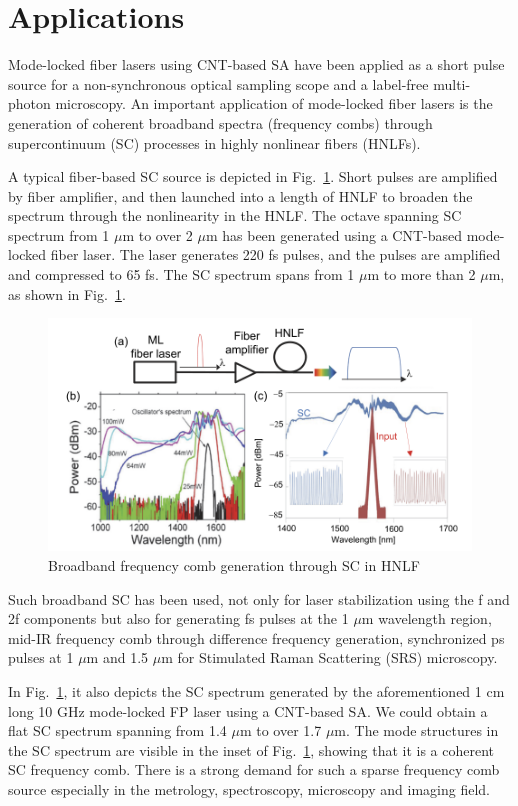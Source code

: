 \documentclass{phyasgn}\usepackage{nag}
\newcommand{\figref}[1]{Fig.~\ref{#1}}
\begin{document}
\section{Applications}
Mode-locked fiber lasers using CNT-based SA have been applied as a short pulse source for a non-synchronous optical sampling scope and a label-free multi-photon microscopy. An important application of mode-locked fiber lasers is the generation of coherent broadband spectra (frequency combs) through supercontinuum (SC) processes in highly nonlinear fibers (HNLFs). 
\par A typical fiber-based SC source is depicted in \figref{16}. Short pulses are amplified by fiber amplifier, and then launched into a length of HNLF to broaden the spectrum through the nonlinearity in the HNLF. The octave spanning SC spectrum from 1 $\mu$m to over 2 $\mu$m has been generated using a CNT-based mode-locked fiber laser. The laser generates 220 fs pulses, and the pulses are amplified and compressed to 65 fs\cite{kieu2010generation}. The SC spectrum spans from 1 $\mu$m to more than 2 $\mu$m, as shown in \figref{16}. 
\begin{figure}[!h]
	\centering
	\includegraphics[width=.9\linewidth]{pic/16.png}
	\caption[Band structures]{Broadband frequency comb generation through SC in HNLF\cite{kieu2010generation}}
	\label{16}
	\end{figure}
\par Such broadband SC has been used, not only for laser stabilization using the f and 2f components but also for generating fs pulses at the 1 $\mu$m wavelength region, mid-IR frequency comb through difference frequency generation, synchronized ps pulses at 1 $\mu$m and 1.5 $\mu$m for Stimulated Raman Scattering (SRS) microscopy\cite{freudiger2014stimulated,tsuzuki2016midinfrared,kieu2010generation}.
\par In \figref{16}, it also depicts the SC spectrum generated by the aforementioned 1 cm long 10 GHz mode-locked FP laser using a CNT-based SA. We could obtain a flat SC spectrum spanning from 1.4 $\mu$m to over 1.7 $\mu$m. The mode structures in the SC spectrum are visible in the inset of \figref{16}, showing that it is a coherent SC frequency comb. There is a strong demand for such a sparse frequency comb source especially in the metrology, spectroscopy, microscopy and imaging field.
\end{document}
